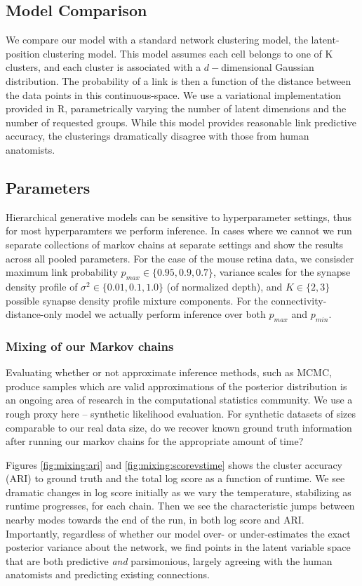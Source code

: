 \documentclass{article}
\begin{document}
\subsection*{Model Comparison}
We compare our model with a standard network clustering model, the
latent-position clustering model. This model assumes each cell belongs
to one of K clusters, and each cluster is associated with a
$d-$dimensional Gaussian distribution. The probability of a link is
then a function of the distance between the data points in this
continuous-space. We use \autocite{Salter-Townshend2013} a variational
implementation provided in R, parametrically varying the number of
latent dimensions and the number of requested groups.  While this
model provides reasonable link predictive accuracy, the clusterings
dramatically disagree with those from human anatomists.


\subsection*{Parameters}

Hierarchical generative models can be sensitive to hyperparameter
settings, thus for most hyperparamters we perform inference. In cases
where we cannot we run separate collections of markov chains at
separate settings and show the results across all pooled
parameters. For the case of the mouse retina data, we consisder
maximum link probability $p_{max} \in \{0.95, 0.9, 0.7\}$, variance
scales for the synapse density profile of $\sigma^2 \in \{0.01, 0.1,
1.0\}$ (of normalized depth), and $K \in \{2, 3\}$ possible synapse
density profile mixture components. For the connectivity-distance-only
model we actually perform inference over both $p_{max}$ and $p_{min}$.


\subsubsection*{Mixing of our Markov chains} 
Evaluating whether or not approximate inference methods, such as MCMC,
produce samples which are valid approximations of the posterior
distribution is an ongoing area of research in the computational
statistics community. We use a rough proxy here -- synthetic
likelihood evaluation.  For synthetic datasets of sizes comparable to
our real data size, do we recover known ground truth information after
running our markov chains for the appropriate amount of time?

Figures \ref{fig:mixing:ari} and \ref{fig:mixing:scorevstime} shows
the cluster accuracy (ARI) to ground truth and the total log score as a function of
runtime.  We see dramatic changes in log score initially as we vary
the temperature, stabilizing as runtime progresses, for each
chain. Then we see the characteristic jumps between nearby modes
towards the end of the run, in both log score and ARI.  Importantly,
regardless of whether our model over- or under-estimates the exact
posterior variance about the network, we find points in the latent
variable space that are both predictive \textit{and} parsimonious,
largely agreeing with the human anatomists and predicting existing
connections.
\end{document}
